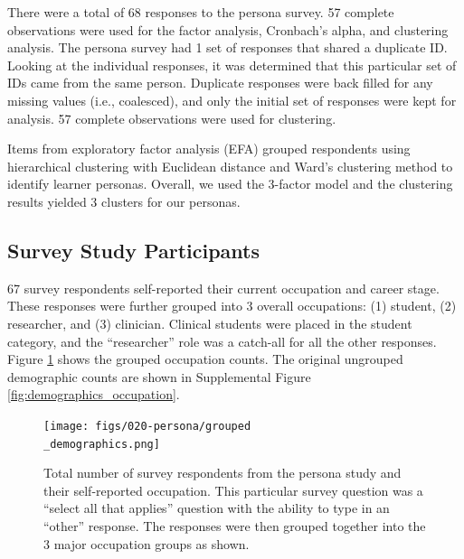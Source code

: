 \documentclass[020-persona\_validation.tex]{subfiles}
\begin{document}
    There were a total of 68 responses to the persona survey.
    57 complete observations %
    were used for the factor analysis, Cronbach's alpha, and clustering analysis.
    The persona survey had 1 set of responses %
    that shared a duplicate ID.
    Looking at the individual responses,
    it was determined that this particular set of IDs came from the same person.
    Duplicate responses were back filled for any missing values (i.e., coalesced),
    and only the initial set of responses were kept for analysis.
    57 complete observations %
    were used for clustering.

    Items from exploratory factor analysis (EFA) grouped respondents
    using hierarchical clustering with Euclidean distance and Ward's clustering method
    to identify learner personas.
    Overall,
    we used the 3-factor model and the clustering results yielded 3 clusters for our personas.

    \subsection{Survey Study Participants}

        67 survey respondents self-reported their current occupation and career stage.
        These responses were further grouped into 3 overall occupations:
        (1) student,
        (2) researcher, and
        (3) clinician.
        Clinical students were placed in the student category,
        and the ``researcher'' role was a catch-all for all the other responses.
        Figure \ref{fig:groupeddemographics} shows the grouped occupation counts.
        The original ungrouped demographic counts are shown in Supplemental Figure \ref{fig:demographics_occupation}.

        \begin{figure}[!htbp]
            \centering
            \texttt{[image: figs/020-persona/grouped\\\_demographics.png]}
            \caption[Grouped demographics for persona survey respondents]{
            Total number of survey respondents from the persona study and their self-reported occupation.
                This particular survey question was a ``select all that applies''
                question with the ability to type in an ``other'' response.
                The responses were then grouped together into the 3 major occupation groups as shown.}
            \label{fig:groupeddemographics}
        \end{figure}
\end{document}
